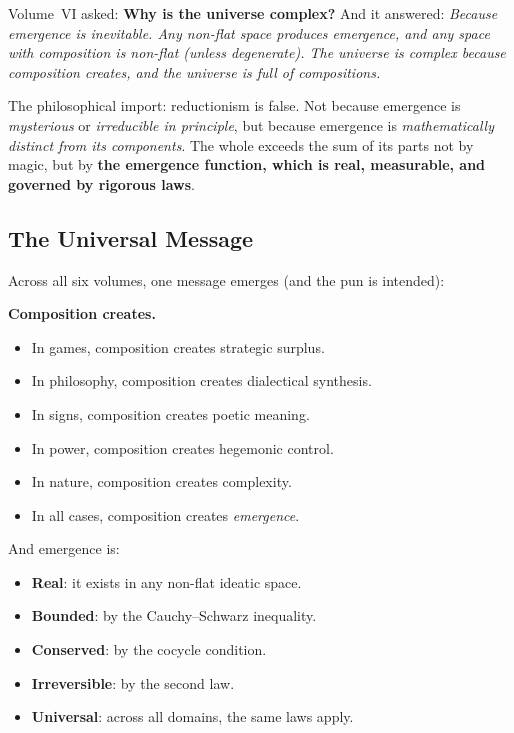 Volume~VI asked: \textbf{Why is the universe complex?} And it answered:
\emph{Because emergence is inevitable. Any non-flat space produces emergence,
and any space with composition is non-flat (unless degenerate). The universe
is complex because composition creates, and the universe is full of compositions.}

The philosophical import: reductionism is false. Not because emergence is
\emph{mysterious} or \emph{irreducible in principle}, but because emergence is
\emph{mathematically distinct from its components}. The whole exceeds the sum
of its parts not by magic, but by \textbf{the emergence function, which is
real, measurable, and governed by rigorous laws}.

\subsection{The Universal Message}

Across all six volumes, one message emerges (and the pun is intended):

\begin{center}
\Large\textbf{Composition creates.}
\end{center}

\begin{itemize}
  \item In games, composition creates strategic surplus.
  \item In philosophy, composition creates dialectical synthesis.
  \item In signs, composition creates poetic meaning.
  \item In power, composition creates hegemonic control.
  \item In nature, composition creates complexity.
  \item In all cases, composition creates \emph{emergence}.
\end{itemize}

And emergence is:
\begin{itemize}
  \item \textbf{Real}: it exists in any non-flat ideatic space.
  \item \textbf{Bounded}: by the Cauchy--Schwarz inequality.
  \item \textbf{Conserved}: by the cocycle condition.
  \item \textbf{Irreversible}: by the second law.
  \item \textbf{Universal}: across all domains, the same laws apply.
\end{itemize}

